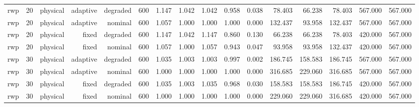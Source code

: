 \begin{tabular}{lrrrrrrrrrrrrrrr}
rwp & 20 & physical & adaptive & degraded & 600 & 1.147 & 1.042 & 1.042 & 0.958 & 0.038 & 78.403 & 66.238 & 78.403 & 567.000 & 567.000 \\
rwp & 20 & physical & adaptive & nominal & 600 & 1.057 & 1.000 & 1.000 & 1.000 & 0.000 & 132.437 & 93.958 & 132.437 & 567.000 & 567.000 \\
rwp & 20 & physical & fixed & degraded & 600 & 1.147 & 1.042 & 1.147 & 0.860 & 0.130 & 66.238 & 66.238 & 78.403 & 420.000 & 567.000 \\
rwp & 20 & physical & fixed & nominal & 600 & 1.057 & 1.000 & 1.057 & 0.943 & 0.047 & 93.958 & 93.958 & 132.437 & 420.000 & 567.000 \\
rwp & 30 & physical & adaptive & degraded & 600 & 1.035 & 1.003 & 1.003 & 0.997 & 0.002 & 186.745 & 158.583 & 186.745 & 567.000 & 567.000 \\
rwp & 30 & physical & adaptive & nominal & 600 & 1.000 & 1.000 & 1.000 & 1.000 & 0.000 & 316.685 & 229.060 & 316.685 & 567.000 & 567.000 \\
rwp & 30 & physical & fixed & degraded & 600 & 1.035 & 1.003 & 1.035 & 0.968 & 0.030 & 158.583 & 158.583 & 186.745 & 420.000 & 567.000 \\
rwp & 30 & physical & fixed & nominal & 600 & 1.000 & 1.000 & 1.000 & 1.000 & 0.000 & 229.060 & 229.060 & 316.685 & 420.000 & 567.000 \\
\bottomrule
\end{tabular}
